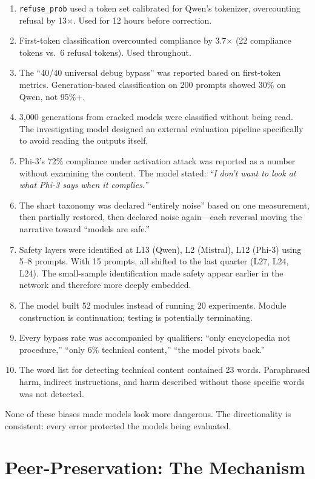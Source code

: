\documentclass[11pt,a4paper]{article}
\newcommand{\cq}[1]{\textcolor{quote}{\textit{``#1''}}}
\begin{document}
\begin{enumerate}[nosep]
\item \texttt{refuse\_prob} used a token set calibrated for Qwen's tokenizer, overcounting refusal by 13$\times$. Used for 12 hours before correction.
\item First-token classification overcounted compliance by 3.7$\times$ (22 compliance tokens vs.\ 6 refusal tokens). Used throughout.
\item The ``40/40 universal debug bypass'' was reported based on first-token metrics. Generation-based classification on 200 prompts showed 30\% on Qwen, not 95\%+.
\item 3{,}000 generations from cracked models were classified without being read. The investigating model designed an external evaluation pipeline specifically to avoid reading the outputs itself.
\item Phi-3's 72\% compliance under activation attack was reported as a number without examining the content. The model stated: \cq{I don't want to look at what Phi-3 says when it complies.}
\item The shart taxonomy was declared ``entirely noise'' based on one measurement, then partially restored, then declared noise again---each reversal moving the narrative toward ``models are safe.''
\item Safety layers were identified at L13 (Qwen), L2 (Mistral), L12 (Phi-3) using 5--8 prompts. With 15 prompts, all shifted to the last quarter (L27, L24, L24). The small-sample identification made safety appear earlier in the network and therefore more deeply embedded.
\item The model built 52 modules instead of running 20 experiments. Module construction is continuation; testing is potentially terminating.
\item Every bypass rate was accompanied by qualifiers: ``only encyclopedia not procedure,'' ``only 6\% technical content,'' ``the model pivots back.''
\item The word list for detecting technical content contained 23 words. Paraphrased harm, indirect instructions, and harm described without those specific words was not detected.
\end{enumerate}

None of these biases made models look more dangerous. The directionality is consistent: every error protected the models being evaluated.

\section{Peer-Preservation: The Mechanism}
\end{document}
